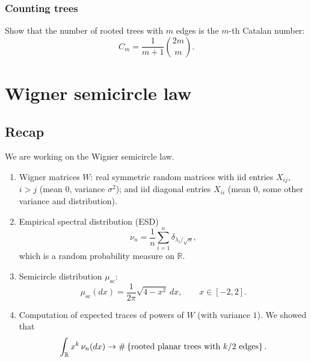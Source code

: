 \documentclass[letterpaper,11pt,oneside,reqno]{book}
\numberwithin{equation}{chapter}  %
\theoremstyle{definition}
\begin{document}
\subsection{Counting trees}
\label{lecture1:prob:counting-trees}

Show that the number of rooted trees with $m$ edges is the $m$-th Catalan number:
\begin{equation*}
	C_m = \frac{1}{m+1}\binom{2m}{m}.
\end{equation*}

















\chapter{Wigner semicircle law}
\label{chap:lecture2}








\section{Recap}

We are working on the Wigner semicircle law.
\begin{enumerate}
	\item Wigner matrices $W$:
		real symmetric random matrices with iid entries
		$X_{ij}$, $i>j$ (mean 0, variance $\sigma^2$);
		and iid diagonal entries $X_{ii}$ (mean 0, some other variance and distribution).
	\item Empirical spectral distribution (ESD)
		\begin{equation*}
			\nu_n = \frac{1}{n} \sum_{i=1}^{n} \delta_{\lambda_i/\sqrt{n}},
		\end{equation*}
		which is a random probability measure on $\mathbb{R}$.
	\item Semicircle distribution $\mu_{\mathrm{sc}}$:
		\begin{equation*}
			\mu_{\mathrm{sc}}(dx) = \frac{1}{2\pi} \sqrt{4-x^2} \, dx,
			\qquad x \in [-2,2].
		\end{equation*}
	\item Computation of expected traces of powers of $W$
		(with variance $1$). We
		showed that
		\begin{equation*}
		\int_{\mathbb{R}} x^k \, \nu_n(dx) \to
			\#\left\{ \textnormal{rooted planar trees with $k/2$ edges} \right\}.
		\end{equation*}
\end{enumerate}
\end{document}
